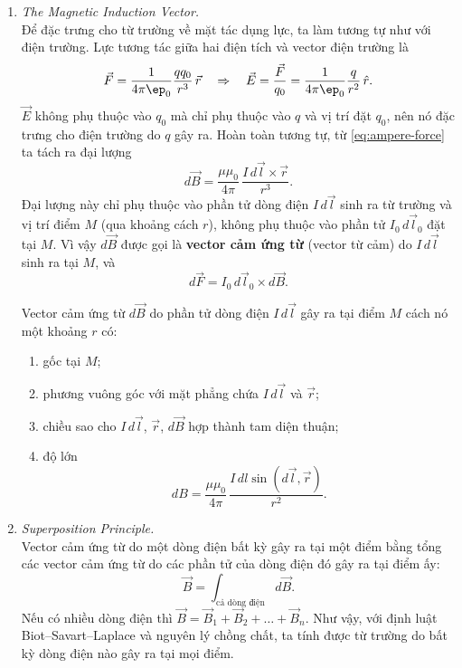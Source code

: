 \begin{enumerate}
\item \textit{The Magnetic Induction Vector.}\\
Để đặc trưng cho từ trường về mặt tác dụng lực, ta làm tương tự như với điện trường. Lực tương tác giữa hai điện tích và vector điện trường là
\[
\vec{F} = \frac{1}{4\pi\ep_0}\frac{q q_0}{r^3}\,\vec{r}
\quad\Rightarrow\quad
\vec{E} = \frac{\vec{F}}{q_0} = \frac{1}{4\pi\ep_0}\frac{q}{r^2}\,\hat{r}.
\]
$\vec{E}$ không phụ thuộc vào $q_0$ mà chỉ phụ thuộc vào $q$ và vị trí đặt $q_0$, nên nó đặc trưng cho điện trường do $q$ gây ra. Hoàn toàn tương tự, từ \cref{eq:ampere-force} ta tách ra đại lượng
\begin{equation}\label{eq:bsl}
d\vec{B} = \frac{\mu\mu_0}{4\pi}\,\frac{I\,d\vec{l} \times \vec{r}}{r^3}.
\end{equation}
Đại lượng này chỉ phụ thuộc vào phần tử dòng điện $I\,d\vec{l}$ sinh ra từ trường và vị trí điểm $M$ (qua khoảng cách $r$), không phụ thuộc vào phần tử $I_0\,d\vec{l}_0$ đặt tại $M$. Vì vậy $d\vec{B}$ được gọi là \textbf{vector cảm ứng từ} (vector từ cảm) do $I\,d\vec{l}$ sinh ra tại $M$, và
\[
d\vec{F} = I_0\,d\vec{l}_0 \times d\vec{B}.
\]

\begin{theorem}
Vector cảm ứng từ $d\vec{B}$ do phần tử dòng điện $I\,d\vec{l}$ gây ra tại điểm $M$ cách nó một khoảng $r$ có:
\begin{enumerate}
  \item[(a)] gốc tại $M$;
  \item[(b)] phương vuông góc với mặt phẳng chứa $I\,d\vec{l}$ và $\vec{r}$;
  \item[(c)] chiều sao cho $I\,d\vec{l}$, $\vec{r}$, $d\vec{B}$ hợp thành tam diện thuận;
  \item[(d)] độ lớn
  \[
  dB = \frac{\mu\mu_0}{4\pi}\,\frac{I\,dl\sin(d\vec{l},\vec{r})}{r^2}.
  \]
\end{enumerate}
\end{theorem}

\item \textit{Superposition Principle.}\\
Vector cảm ứng từ do một dòng điện bất kỳ gây ra tại một điểm bằng tổng các vector cảm ứng từ do các phần tử của dòng điện đó gây ra tại điểm ấy:
\[
\vec{B} = \int_{\text{cả dòng điện}} d\vec{B}.
\]
Nếu có nhiều dòng điện thì $\vec{B} = \vec{B}_1 + \vec{B}_2 + \dots + \vec{B}_n$. Như vậy, với định luật Biot--Savart--Laplace và nguyên lý chồng chất, ta tính được từ trường do bất kỳ dòng điện nào gây ra tại mọi điểm.


\end{enumerate}
